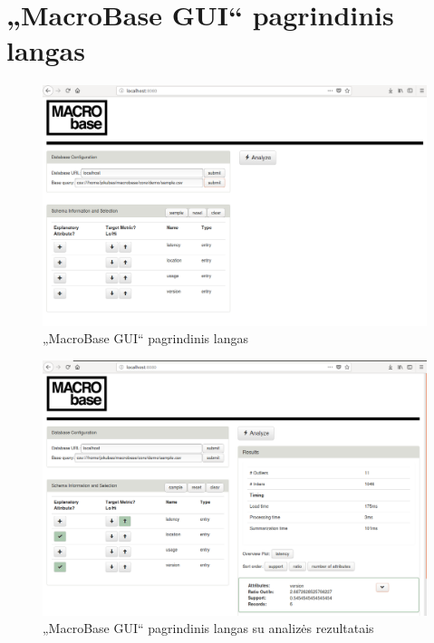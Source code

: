 \documentclass{VUMIFPSkursinis}
\begin{document}
\section{„MacroBase GUI“ pagrindinis langas} \label{sec:gui}
\begin{figure}[H]
    \centering
    \includegraphics[scale=0.33]{img/gui}
    \caption{„MacroBase GUI“ pagrindinis langas}
    \label{img:gui}
\end{figure}
\begin{figure}[H]
    \centering
    \includegraphics[scale=0.33]{img/gui2}
    \caption{„MacroBase GUI“ pagrindinis langas su analizės rezultatais}
    \label{img:gui2}
\end{figure}
\end{document}

